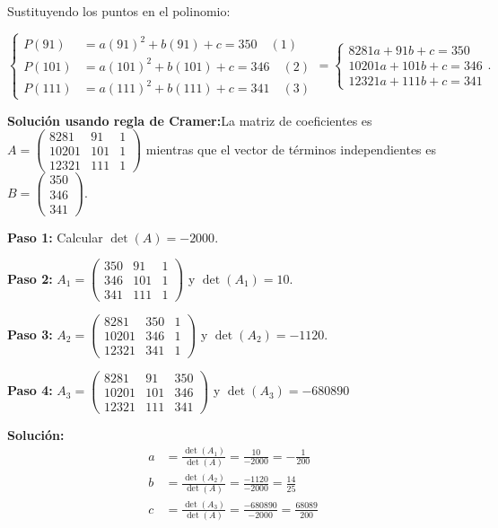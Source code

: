 \begin{prob}
\begin{myproof}
Sustituyendo los puntos en el polinomio: 

$\begin{cases}
P(91) &= a(91)^2 + b(91) + c = 350 \quad (1)\\
P(101) &= a(101)^2 + b(101) + c = 346 \quad (2)\\
P(111) &= a(111)^2 + b(111) + c = 341 \quad (3)
\end{cases}= \begin{cases} 8281a + 91b + c = 350\\
10201a + 101b + c = 346\\
12321a + 111b + c = 341
\end{cases}.$

\textbf{Solución usando regla de Cramer:}La matriz de coeficientes es \(
A = \begin{pmatrix}
8281 & 91 & 1 \\
10201 & 101 & 1 \\
12321 & 111 & 1
\end{pmatrix}
\) mientras que el vector de términos independientes es \(
B = \begin{pmatrix}
350 \\ 346 \\ 341
\end{pmatrix}.\)

\textbf{Paso 1:} Calcular $\det(A)= -2000.$

\textbf{Paso 2:} $A_1 = \begin{pmatrix}
350 & 91 & 1 \\
346 & 101 & 1 \\
341 & 111 & 1
\end{pmatrix}$ y $\det(A_1) = 10.$

\textbf{Paso 3:} $A_2 = \begin{pmatrix}
8281 & 350 & 1 \\
10201 & 346 & 1 \\
12321 & 341 & 1
\end{pmatrix}$ y $\det(A_2) = -1120.$

\textbf{Paso 4:} $A_3 = \begin{pmatrix}
8281 & 91 & 350 \\
10201 & 101 & 346 \\
12321 & 111 & 341
\end{pmatrix}$ y $\det(A_3) = -680890$

\textbf{Solución:}
\begin{align*}
a &= \frac{\det(A_1)}{\det(A)} = \frac{10}{-2000} = -\frac{1}{200} \\
b &= \frac{\det(A_2)}{\det(A)} = \frac{-1120}{-2000} = \frac{14}{25} \\
c &= \frac{\det(A_3)}{\det(A)} = \frac{-680890}{-2000} = \frac{68089}{200}
\end{align*}


\end{myproof}
\end{prob}
